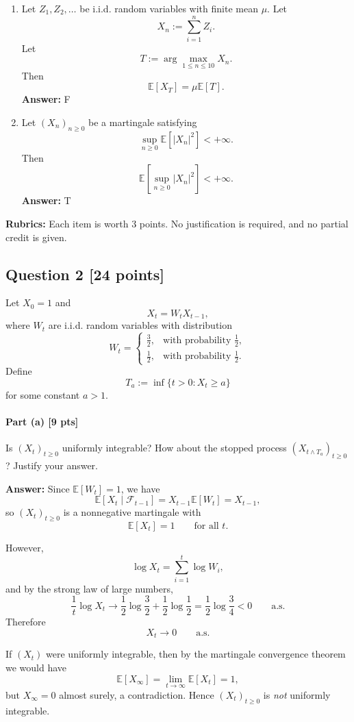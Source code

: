 \documentclass[11pt]{article}
\theoremstyle{definition}
\begin{document}
\begin{enumerate}[label=(\arabic*)]
    \item Let \(Z_1,Z_2,\dots\) be i.i.d. random variables with finite mean \(\mu\). Let
    \[
    X_n:=\sum_{i=1}^n Z_i.
    \]
    Let
    \[
    T:=\arg\max_{1\le n\le 10} X_n.
    \]
    Then
    \[
    \mathbb E[X_T]=\mu \mathbb E[T].
    \]
    \textbf{Answer:} F

    \item Let \((X_n)_{n\ge 0}\) be a martingale satisfying
    \[
    \sup_{n\ge 0}\mathbb E[|X_n|^2]<+\infty.
    \]
    Then
    \[
    \mathbb E\left[\sup_{n\ge 0}|X_n|^2\right]<+\infty.
    \]
    \textbf{Answer:} T
\end{enumerate}

\textbf{Rubrics:} Each item is worth \(3\) points. No justification is required, and no partial credit is given.

\subsection*{Question 2 \hfill [24 points]}

Let \(X_0=1\) and
\[
X_t=W_tX_{t-1},
\]
where \(W_t\) are i.i.d. random variables with distribution
\[
W_t=
\begin{cases}
\frac32, & \text{with probability } \frac12,\\[0.4em]
\frac12, & \text{with probability } \frac12.
\end{cases}
\]
Define
\[
T_a:=\inf\{t>0:X_t\ge a\}
\]
for some constant \(a>1\).

\paragraph{Part (a) \hfill [9 pts]}
Is \((X_t)_{t\ge 0}\) uniformly integrable? How about the stopped process \((X_{t\wedge T_a})_{t\ge 0}\)? Justify your answer.

\textbf{Answer:}
Since \(\mathbb E[W_t]=1\), we have
\[
\mathbb E[X_t\mid \mathcal F_{t-1}]
=
X_{t-1}\mathbb E[W_t]
=
X_{t-1},
\]
so \((X_t)_{t\ge 0}\) is a nonnegative martingale with
\[
\mathbb E[X_t]=1
\qquad \text{for all } t.
\]

However,
\[
\log X_t=\sum_{i=1}^t \log W_i,
\]
and by the strong law of large numbers,
\[
\frac{1}{t}\log X_t
\to
\frac12\log\frac32+\frac12\log\frac12
=
\frac12\log\frac34
<0
\qquad \text{a.s.}
\]
Therefore
\[
X_t\to 0
\qquad \text{a.s.}
\]

If \((X_t)\) were uniformly integrable, then by the martingale convergence theorem we would have
\[
\mathbb E[X_\infty]=\lim_{t\to\infty}\mathbb E[X_t]=1,
\]
but \(X_\infty=0\) almost surely, a contradiction. Hence \((X_t)_{t\ge 0}\) is \emph{not} uniformly integrable.
\end{document}
